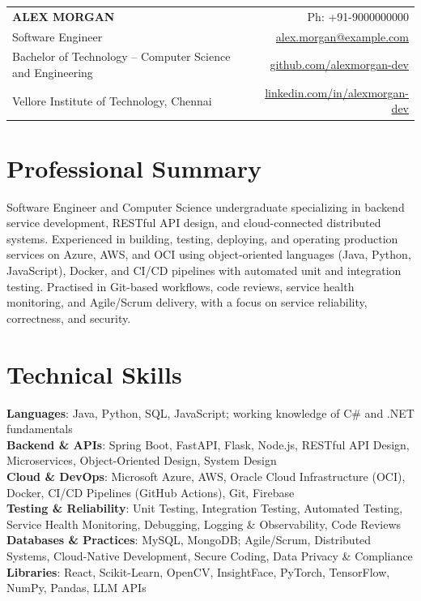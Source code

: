 \documentclass[a4paper,11pt]{article}
\makeatletter
\newcommand{\name}{ALEX MORGAN}
\newcommand{\phone}{9000000000}
\newcommand{\emaila}{alex.morgan@example.com}
\makeatother
\begin{document}
\selectfont

{
\begin{tabularx}{\linewidth}{L r} \\
  \textbf{\Large \name} & Ph: +91-\phone\\
  {Software Engineer} & \href{mailto:\emaila}{\emaila} \\
  Bachelor of Technology -- Computer Science and Engineering & \href{https://github.com/alexmorgan-dev}{github.com/alexmorgan-dev} \\
  {Vellore Institute of Technology, Chennai} & \href{https://www.linkedin.com/in/alexmorgan-dev}{linkedin.com/in/alexmorgan-dev}
\end{tabularx}
}

\vspace{-4mm}

\section{\textbf{Professional Summary}}
\justifying
Software Engineer and Computer Science undergraduate specializing in backend service development, RESTful API design, and cloud-connected distributed systems. Experienced in building, testing, deploying, and operating production services on Azure, AWS, and OCI using object-oriented languages (Java, Python, JavaScript), Docker, and CI/CD pipelines with automated unit and integration testing. Practised in Git-based workflows, code reviews, service health monitoring, and Agile/Scrum delivery, with a focus on service reliability, correctness, and security.
\vspace{-4mm}

\section{\textbf{Technical Skills}}
 \begin{itemize}[leftmargin=0.05in, label={}]
    \small{\item{
     \textbf{Languages}{: Java, Python, SQL, JavaScript; working knowledge of C\# and .NET fundamentals} \\
     \textbf{Backend \& APIs}{: Spring Boot, FastAPI, Flask, Node.js, RESTful API Design, Microservices, Object-Oriented Design, System Design} \\
     \textbf{Cloud \& DevOps}{: Microsoft Azure, AWS, Oracle Cloud Infrastructure (OCI), Docker, CI/CD Pipelines (GitHub Actions), Git, Firebase} \\
     \textbf{Testing \& Reliability}{: Unit Testing, Integration Testing, Automated Testing, Service Health Monitoring, Debugging, Logging \& Observability, Code Reviews} \\
     \textbf{Databases \& Practices}{: MySQL, MongoDB; Agile/Scrum, Distributed Systems, Cloud-Native Development, Secure Coding, Data Privacy \& Compliance} \\
     \textbf{Libraries}{: React, Scikit-Learn, OpenCV, InsightFace, PyTorch, TensorFlow, NumPy, Pandas, LLM APIs}
    }}
 \end{itemize}
 \vspace{-6mm}
\end{document}
